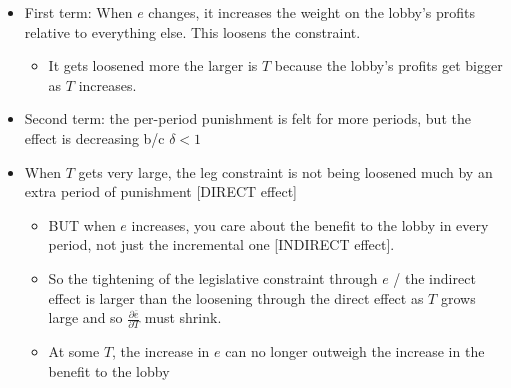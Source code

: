 \documentclass[12pt]{article}
\newcommand{\ov}{\overline}
\begin{document}
\begin{itemize}
	\item First term: When $e$ changes, it increases the weight on the lobby's profits relative to everything else. This loosens the constraint.
		\begin{itemize}
			\item It gets loosened more the larger is $T$ because the lobby's profits get bigger as $T$ increases.
		\end{itemize}
	\item Second term: the per-period punishment is felt for more periods, but the effect is decreasing b/c $\delta < 1$
	\item When $T$ gets very large, the leg constraint is not being loosened much by an extra period of punishment [DIRECT effect]
		\begin{itemize}
			\item BUT when $e$ increases, you care about the benefit to the lobby in every period, not just the incremental one [INDIRECT effect].
			\item So the tightening of the legislative constraint through $e$ / the indirect effect is larger than the loosening through the direct effect as $T$ grows large and so $\frac{\partial \ov{e}}{\partial T}$ must shrink.
			\item At some $T$, the increase in $e$ can no longer outweigh the increase in the benefit to the lobby
		\end{itemize}
\end{itemize}




\newpage
\end{document}
